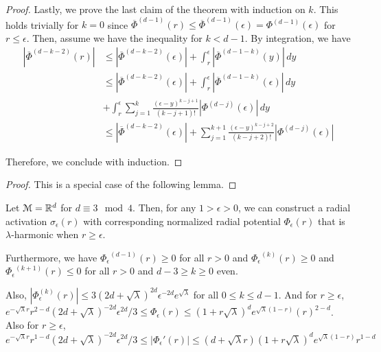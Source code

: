 \begin{proof}
Lastly, we prove the last claim of the theorem with induction on $k$. This holds trivially for $k = 0$ since $\overline{\Phi}^{(d-1)}(r) \leq \overline{\Phi}^{(d-1)}(\epsilon) = \Phi^{(d-1)}(\epsilon)$ for $r \leq \epsilon$. Then, assume we have the inequality for $k < d-1$. By integration, we have
\begin{align*}
|\overline{\Phi}^{(d-k-2)}(r)| & \leq |\overline{\Phi}^{(d-k-2)}(\epsilon)| + \int_r^\epsilon |\overline{\Phi}^{(d-1 -k)}(y)| \, dy \\
& \leq |\overline{\Phi}^{(d-k-2)}(\epsilon)| + \int_r^\epsilon |\overline{\Phi}^{(d-1 -k)}(\epsilon)| \, dy \\
& + \int_r^\epsilon \sum_{j=1}^k \frac{(\epsilon -y)^{k-j+1}}{(k-j+1)!}|\Phi^{(d-j)}(\epsilon)| \, dy \\
& \leq  |\overline{\Phi}^{(d-k-2)}(\epsilon)| + \sum_{j=1}^{k+1}  \frac{(\epsilon -y)^{k-j+2}}{(k-j+2)!}|\Phi^{(d-j)}(\epsilon)|
\end{align*}

Therefore, we conclude with induction.
\end{proof}

\almostharmreal*

\begin{proof}
This is a special case of the following lemma.
\end{proof}

\begin{lemma}
Let $\mathcal{M} = {\mathbb{R}}^d$ for $d \equiv 3 \mod 4$. Then, for any $1 > \epsilon > 0$, we can construct a radial activation $\sigma_\epsilon(r)$ with corresponding normalized radial potential $\Phi_\epsilon(r)$ that is $\lambda$-harmonic when $r \geq \epsilon$.

Furthermore, we have ${\Phi_\epsilon}^{(d-1)}(r) \geq 0$ for all $r  > 0$ and ${\Phi_\epsilon}^{(k)}(r) \geq 0$ and ${\Phi_\epsilon}^{(k+1)}(r)\leq 0$ for all $r > 0$ and $d - 3 \geq k \geq 0 $ even. 

Also, $|{\Phi}_\epsilon^{(k)}(r)| \leq 3(2d + \sqrt{\lambda})^{2d} \epsilon^{-2d}e^{\sqrt{\lambda}}$ for all $0 \leq k \leq d-1$. And for $r \geq \epsilon$, $e^{-\sqrt{\lambda}r}r^{2-d}(2d+\sqrt{\lambda})^{-2d}\epsilon^{2d}/3\leq {\Phi}_\epsilon(r) \leq (1+r\sqrt{\lambda})^de^{\sqrt{\lambda}(1-r)}(r)^{2-d}$. Also for $r \geq \epsilon$, $ e^{-\sqrt{\lambda}r}r^{1-d}(2d+\sqrt{\lambda})^{-2d}\epsilon^{2d}/3 \leq |{\Phi}_\epsilon'(r)| \leq (d+\sqrt{\lambda}r)(1+ r\sqrt{\lambda})^de^{\sqrt{\lambda}(1- r)} r^{1-d}$
\end{lemma}


